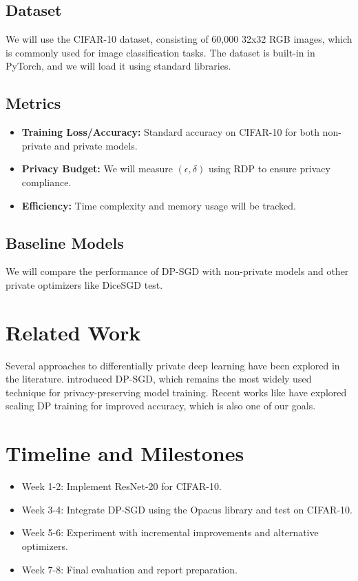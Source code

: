 \documentclass{article}
\begin{document}
\subsection{Dataset}
We will use the CIFAR-10 dataset, consisting of 60,000 32x32 RGB images, which is commonly used for image classification tasks. The dataset is built-in in PyTorch, and we will load it using standard libraries.

\subsection{Metrics}
\begin{itemize}
    \item \textbf{Training Loss/Accuracy:} Standard accuracy on CIFAR-10 for both non-private and private models.
    \item \textbf{Privacy Budget:} We will measure $(\epsilon, \delta)$ using RDP to ensure privacy compliance.
    \item \textbf{Efficiency:} Time complexity and memory usage will be tracked.
\end{itemize}

\subsection{Baseline Models}
We will compare the performance of DP-SGD with non-private models and other private optimizers like DiceSGD test. 

\section{Related Work}
Several approaches to differentially private deep learning have been explored in the literature. \citet{abadi2016deep} introduced DP-SGD, which remains the most widely used technique for privacy-preserving model training. Recent works like \citet{de2022unlocking} have explored scaling DP training for improved accuracy, which is also one of our goals.

\section{Timeline and Milestones}
\begin{itemize}
    \item Week 1-2: Implement ResNet-20 for CIFAR-10.
    \item Week 3-4: Integrate DP-SGD using the Opacus library and test on CIFAR-10.
    \item Week 5-6: Experiment with incremental improvements and alternative optimizers.
    \item Week 7-8: Final evaluation and report preparation.
\end{itemize}
\end{document}
